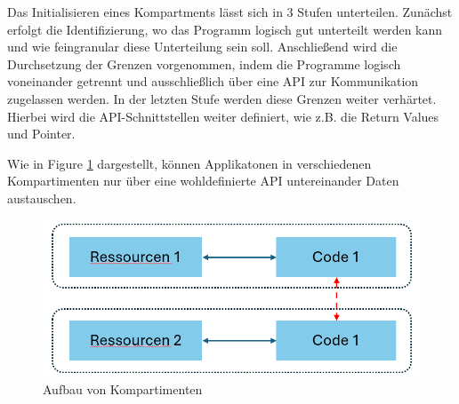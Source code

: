 Das Initialisieren eines Kompartments lässt sich in 3 Stufen unterteilen. Zunächst erfolgt die Identifizierung, wo das Programm logisch gut unterteilt werden kann und wie feingranular diese Unterteilung sein soll.
Anschließend wird die Durchsetzung der Grenzen vorgenommen, indem die Programme logisch voneinander getrennt und ausschließlich über eine API zur Kommunikation zugelassen werden. 
In der letzten Stufe werden diese Grenzen weiter verhärtet. Hierbei wird die API-Schnittstellen weiter definiert, wie z.B. die Return Values und Pointer.

Wie in Figure \ref{fig:Kompartment} dargestellt, können Applikatonen in verschiedenen Kompartimenten nur über eine wohldefinierte API untereinander Daten austauschen.

\begin{figure}[h]
    \centering
    \includegraphics[width=0.8\linewidth]{Grafiken/Kompartiment.png}
    \caption{Aufbau von Kompartimenten}
    \label{fig:Kompartment}
\end{figure}

